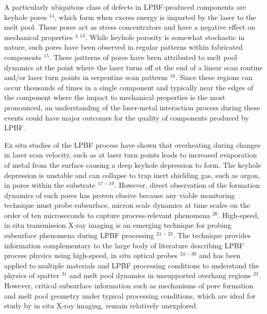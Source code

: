\documentclass[10pt]{article}
\begin{document}
A particularly ubiquitous class of defects in LPBF-produced components are keyhole pores ${ }^{14}$, which form when excess energy is imparted by the laser to the melt pool. These pores act as stress concentrators and have a negative effect on mechanical properties ${ }^{4,13}$. While keyhole porosity is somewhat stochastic in nature, such pores have been observed in regular patterns within fabricated components ${ }^{15}$. These patterns of pores have been attributed to melt pool dynamics at the point where the laser turns off at the end of a linear scan routine and/or laser turn points in serpentine scan patterns ${ }^{16}$. Since these regions can occur thousands of times in a single component and typically near the edges of the component where the impact to mechanical properties is the most pronounced, an understanding of the laser-metal interaction process during these events could have major outcomes for the quality of components produced by LPBF.

Ex situ studies of the LPBF process have shown that overheating during changes in laser scan velocity, such as at laser turn points leads to increased evaporation of metal from the surface causing a deep keyhole depression to form. The keyhole depression is unstable and can collapse to trap inert shielding gas, such as argon, in pores within the substrate ${ }^{17-19}$. However, direct observation of the formation dynamics of such pores has proven elusive because any viable monitoring technique must probe subsurface, micron scale dynamics at time scales on the order of ten microseconds to capture process-relevant phenomena ${ }^{20}$. High-speed, in situ transmission X-ray imaging is an emerging technique for probing subsurface phenomena during LPBF processing $^{21-23}$. The technique provides information complementary to the large body of literature describing LPBF process physics using high-speed, in situ optical probes ${ }^{24-30}$ and has been applied to multiple materials and LPBF processing conditions to understand the physics of spatter $^{31}$ and melt pool dynamics in unsupported overhang regions ${ }^{23}$. However, critical subsurface information such as mechanisms of pore formation and melt pool geometry under typical processing conditions, which are ideal for study by in situ X-ray imaging, remain relatively unexplored.
\end{document}
